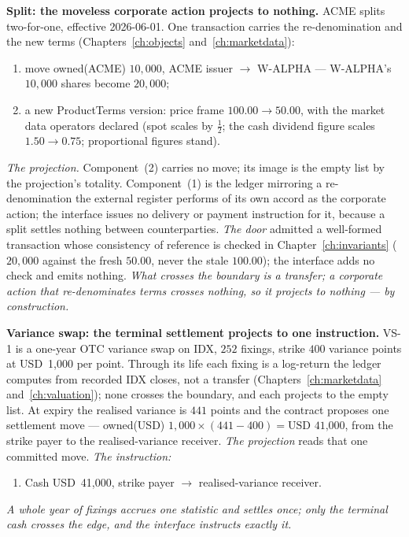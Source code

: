 \documentclass[11pt,a4paper]{article}
\newcommand{\USD}[1]{\mbox{USD~#1}}
\begin{document}
\medskip\noindent\textbf{Split: the moveless corporate action projects to nothing.}
ACME splits two-for-one, effective 2026-06-01. One transaction carries the
re-denomination and the new terms (Chapters~\ref{ch:objects} and~\ref{ch:marketdata}):
\begin{enumerate}[label=(\arabic*),nosep]
\item move owned(ACME) $10{,}000$, ACME issuer $\to$ W-ALPHA --- W-ALPHA's
$10{,}000$ shares become $20{,}000$;
\item a new ProductTerms version: price frame $100.00 \to 50.00$, with the market
data operators declared (spot scales by $\tfrac12$; the cash dividend figure scales
$1.50 \to 0.75$; proportional figures stand).
\end{enumerate}
\emph{The projection.} Component~(2) carries no move; its image is the empty list by
the projection's totality. Component~(1) is the ledger mirroring a re-denomination
the external register performs of its own accord as the corporate action; the
interface issues no delivery or payment instruction for it, because a split settles
nothing between counterparties.
\emph{The door} admitted a well-formed transaction whose consistency of reference
is checked in Chapter~\ref{ch:invariants} ($20{,}000$ against the fresh $50.00$,
never the stale $100.00$); the interface adds no check and emits nothing.
\emph{What crosses the boundary is a transfer; a corporate action that
re-denominates terms crosses nothing, so it projects to nothing --- by
construction.}

\medskip\noindent\textbf{Variance swap: the terminal settlement projects to one
instruction.} VS-1 is a one-year OTC variance swap on IDX, $252$ fixings, strike $400$
variance points at \USD{1{,}000} per point. Through its life each fixing is a
log-return the ledger computes from recorded IDX closes, not a transfer
(Chapters~\ref{ch:marketdata} and~\ref{ch:valuation}); none crosses the boundary,
and each projects to the empty list. At expiry the realised variance is $441$ points and the contract proposes one
settlement move --- owned(USD) $1{,}000\times(441-400) = \USD{41{,}000}$, from the
strike payer to the realised-variance receiver.
\emph{The projection} reads that one committed move.
\emph{The instruction:}
\begin{enumerate}[label=(\arabic*),nosep]
\item Cash \USD{41{,}000}, strike payer $\to$ realised-variance receiver.
\end{enumerate}
\emph{A whole year of fixings accrues one statistic and settles once; only the terminal
cash crosses the edge, and the interface instructs exactly it.}
\end{document}
